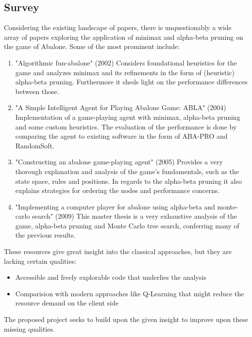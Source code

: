 \documentclass{llncs}
\begin{document}
\subsection{Survey}

Considering the existing landscape of papers, there is unquestionably a wide array of papers exploring the application of minimax and alpha-beta pruning on the game of Abalone. Some of the most prominent include:

\begin{enumerate}
  \item "Algorithmic fun-abalone" (2002) Considers foundational heuristics for the game and analyzes minimax and its refinements in the form of (heuristic) alpha-beta pruning. Furthermore it sheds light on the performance differences between those. \cite{aichholzer_algorithmic_2002}
  \item "A Simple Intelligent Agent for Playing Abalone Game: ABLA" (2004) Implementation of a game-playing agent with minimax, alpha-beta pruning and some custom heuristics. The evaluation of the performance is done by comparing the agent to existing software in the form of ABA-PRO and RandomSoft.\cite{ozcan_simple_2004}
  \item "Constructing an abalone game-playing agent" (2005) Provides a very thorough explanation and analysis of the game's fundamentals, such as the state space, rules and positions. In regards to the alpha-beta pruning it also explains strategies for ordering the nodes and performance concerns. \cite{lemmens_constructing_2005}
  \item "Implementing a computer player for abalone using alpha-beta and monte-carlo search" (2009) This master thesis is a very exhaustive analysis of the game, alpha-beta pruning and Monte Carlo tree search, conferring many of the previous results. \cite{chorus_implementing_2009}
\end{enumerate}

These resources give great insight into the classical approaches, but they are lacking certain qualities:
\begin{itemize}
  \item Accessible and freely explorable code that underlies the analysis
  \item Comparision with modern approaches like Q-Learning that might reduce the resource demand on the client side
\end{itemize}

The proposed project seeks to build upon the given insight to improve upon these missing qualities.
\end{document}
